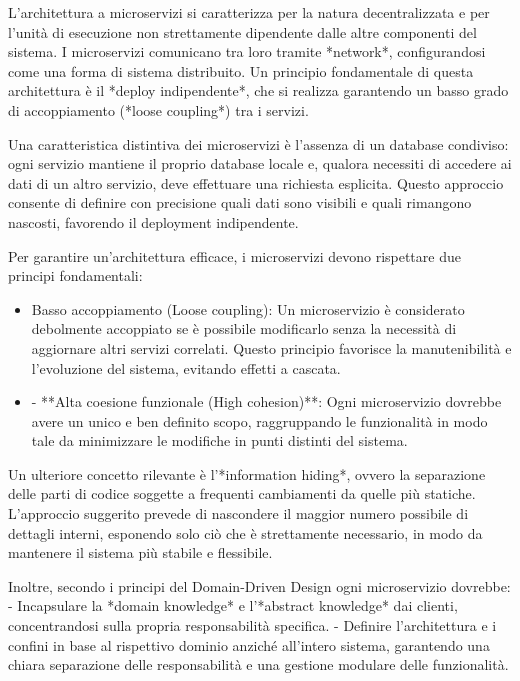         L'architettura a microservizi si caratterizza per la natura decentralizzata e per l’unità di esecuzione non strettamente dipendente dalle altre componenti del sistema. I microservizi comunicano tra loro tramite *network*, configurandosi come una forma di sistema distribuito. Un principio fondamentale di questa architettura è il *deploy indipendente*, che si realizza garantendo un basso grado di accoppiamento (*loose coupling*) tra i servizi.  

        Una caratteristica distintiva dei microservizi è l’assenza di un database condiviso: ogni servizio mantiene il proprio database locale e, qualora necessiti di accedere ai dati di un altro servizio, deve effettuare una richiesta esplicita. Questo approccio consente di definire con precisione quali dati sono visibili e quali rimangono nascosti, favorendo il deployment indipendente.  

        Per garantire un’architettura efficace, i microservizi devono rispettare due principi fondamentali:  
        \begin{itemize}
            \item Basso accoppiamento (Loose coupling): Un microservizio è considerato debolmente accoppiato se è possibile modificarlo senza la necessità di aggiornare altri servizi correlati. Questo principio favorisce la manutenibilità e l'evoluzione del sistema, evitando effetti a cascata.
            \item - **Alta coesione funzionale (High cohesion)**: Ogni microservizio dovrebbe avere un unico e ben definito scopo, raggruppando le funzionalità in modo tale da minimizzare le modifiche in punti distinti del sistema. 
        \end{itemize}

        Un ulteriore concetto rilevante è l’*information hiding*, ovvero la separazione delle parti di codice soggette a frequenti cambiamenti da quelle più statiche. L’approccio suggerito prevede di nascondere il maggior numero possibile di dettagli interni, esponendo solo ciò che è strettamente necessario, in modo da mantenere il sistema più stabile e flessibile.  

        Inoltre, secondo i principi del Domain-Driven Design ogni microservizio dovrebbe:  
        - Incapsulare la *domain knowledge* e l’*abstract knowledge* dai clienti, concentrandosi sulla propria responsabilità specifica.  
        - Definire l’architettura e i confini in base al rispettivo dominio anziché all’intero sistema, garantendo una chiara separazione delle responsabilità e una gestione modulare delle funzionalità.  

